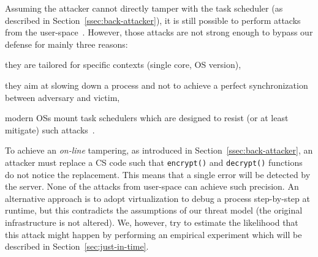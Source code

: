 Assuming the attacker cannot directly tamper with the task scheduler (as 
described in Section~\ref{ssec:back-attacker}), it is still possible to perform 
attacks from the user-space~\cite{5958048}.
However, those attacks are not strong enough to bypass our defense for mainly 
three reasons:
\begin{enumerate*}[label=(\roman*)]
	\item they are tailored for specific contexts (\eg single core, OS version),
	\item they aim at slowing down a process and not to achieve a perfect 
	synchronization between adversary and victim,
	\item modern OSs mount task schedulers which are designed to resist (or at 
	least mitigate) such attacks~\cite{cfslinux}.
\end{enumerate*}
To achieve an \emph{on-line} tampering, as introduced in 
Section~\ref{ssec:back-attacker}, an attacker must replace a CS code such that 
\texttt{encrypt()} and \texttt{decrypt()} functions do not notice the 
replacement.
This means that a single error will be detected by the server. 
None of the attacks from user-space can achieve such precision.
An alternative approach is to adopt virtualization to debug a process 
step-by-step at runtime, but this contradicts the assumptions of our threat 
model (\ie the original infrastructure is not altered).
We, however, try to estimate the likelihood that this attack might happen by 
performing an empirical experiment which will be described in 
Section~\ref{sec:just-in-time}.

